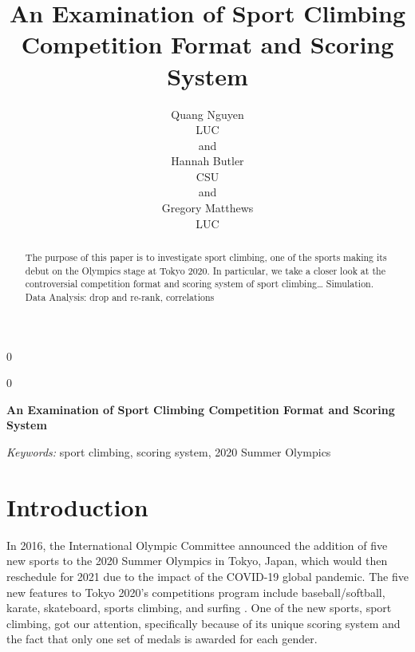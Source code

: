 \documentclass[12pt]{article}
\newcommand{\blind}{0}
\begin{document}
\def\spacingset#1{\renewcommand{\baselinestretch}%
{#1}\small\normalsize} \spacingset{1}



\blind
{
  \title{\bf An Examination of Sport Climbing Competition Format and
Scoring System}

  \author{
        Quang Nguyen \\
    LUC\\
     and \\     Hannah Butler \\
    CSU\\
     and \\     Gregory Matthews \\
    LUC\\
      }
  \maketitle
} \fi

\blind
{
  \bigskip
  \bigskip
  \bigskip
  \begin{center}
    {\LARGE\bf An Examination of Sport Climbing Competition Format and
Scoring System}
  \end{center}
  \medskip
} \fi

\bigskip
\begin{abstract}
The purpose of this paper is to investigate sport climbing, one of the
sports making its debut on the Olympics stage at Tokyo 2020. In
particular, we take a closer look at the controversial competition
format and scoring system of sport climbing\ldots{} Simulation. Data
Analysis: drop and re-rank, correlations
\end{abstract}

\noindent%
{\it Keywords:} sport climbing, scoring system, 2020 Summer Olympics
\vfill

\newpage
\spacingset{1.45} %

\hypertarget{introduction}{%
\section{Introduction}\label{introduction}}

In 2016, the International Olympic Committee announced the addition of
five new sports to the 2020 Summer Olympics in Tokyo, Japan, which would
then reschedule for 2021 due to the impact of the COVID-19 global
pandemic. The five new features to Tokyo 2020's competitions program
include baseball/softball, karate, skateboard, sports climbing, and
surfing \citep{ioc2016}. One of the new sports, sport climbing, got our
attention, specifically because of its unique scoring system and the
fact that only one set of medals is awarded for each gender.
\end{document}
